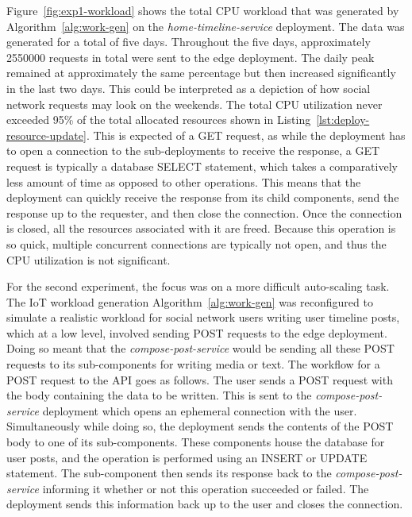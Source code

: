 Figure~\ref{fig:exp1-workload} shows the total CPU workload that was generated by Algorithm~\ref{alg:work-gen} on the \textit{home-timeline-service} deployment. The data was generated for a total of five days. Throughout the five days, approximately \num[group-separator={,}]{2550000} requests in total were sent to the edge deployment. The daily peak remained at approximately the same percentage but then increased significantly in the last two days. This could be interpreted as a depiction of how social network requests may look on the weekends. The total CPU utilization never exceeded 95\% of the total allocated resources shown in Listing~\ref{lst:deploy-resource-update}. This is expected of a GET request, as while the deployment has to open a connection to the sub-deployments to receive the response, a GET request is typically a database SELECT statement, which takes a comparatively less amount of time as opposed to other operations. This means that the deployment can quickly receive the response from its child components, send the response up to the requester, and then close the connection. Once the connection is closed, all the resources associated with it are freed. Because this operation is so quick, multiple concurrent connections are typically not open, and thus the CPU utilization is not significant.\par

For the second experiment, the focus was on a more difficult auto-scaling task. The IoT workload generation Algorithm~\ref{alg:work-gen} was reconfigured to simulate a realistic workload for social network users writing user timeline posts, which at a low level, involved sending POST requests to the edge deployment. Doing so meant that the \textit{compose-post-service} would be sending all these POST requests to its sub-components for writing media or text. The workflow for a POST request to the API goes as follows. The user sends a POST request with the body containing the data to be written. This is sent to the \textit{compose-post-service} deployment which opens an ephemeral connection with the user. Simultaneously while doing so, the deployment sends the contents of the POST body to one of its sub-components. These components house the database for user posts, and the operation is performed using an INSERT or UPDATE statement. The sub-component then sends its response back to the \textit{compose-post-service} informing it whether or not this operation succeeded or failed. The deployment sends this information back up to the user and closes the connection.\par

